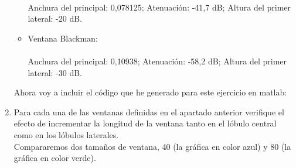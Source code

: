 \documentclass[a4paper,12pt]{article}
\begin{document}
\begin{enumerate}
\begin{itemize}
{}\\
Anchura del principal: 0,078125; Atenuación: -41,7 dB; Altura del primer lateral: -20 dB.
\item Ventana Blackman:\\
\\
Anchura del principal: 0,10938; Atenuación: -58,2 dB; Altura del primer lateral: -30 dB.
\end{itemize}

Ahora voy a incluir el código que he generado para este ejercicio en matlab: \\


\item Para cada una de las ventanas definidas en el apartado anterior verifique el efecto de incrementar la longitud de la ventana tanto en el lóbulo central como en los lóbulos laterales. \\

Compararemos dos tamaños de ventana, 40 (la gráfica en color azul) y 80 (la gráfica en color verde).\\


\end{enumerate}
\end{document}
